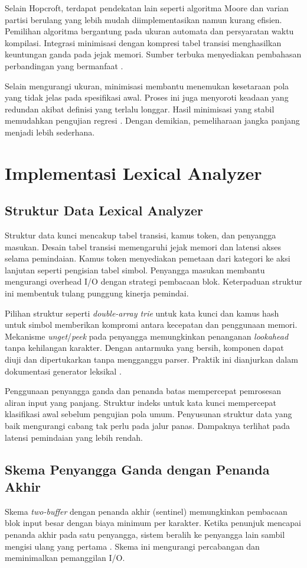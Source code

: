 \documentclass[../main.tex]{subfiles}
\begin{document}
Selain Hopcroft, terdapat pendekatan lain seperti algoritma Moore dan varian partisi berulang yang lebih mudah diimplementasikan namun kurang efisien. Pemilihan algoritma bergantung pada ukuran automata dan persyaratan waktu kompilasi. Integrasi minimisasi dengan kompresi tabel transisi menghasilkan keuntungan ganda pada jejak memori. Sumber terbuka menyediakan pembahasan perbandingan yang bermanfaat \citep{WikiDFAMin,Mogensen2010}.

Selain mengurangi ukuran, minimisasi membantu menemukan kesetaraan pola yang tidak jelas pada spesifikasi awal. Proses ini juga menyoroti keadaan yang redundan akibat definisi yang terlalu longgar. Hasil minimisasi yang stabil memudahkan pengujian regresi \citep{WikiDFAMin}. Dengan demikian, pemeliharaan jangka panjang menjadi lebih sederhana.

\section{Implementasi Lexical Analyzer}
\subsection{Struktur Data Lexical Analyzer}
Struktur data kunci mencakup tabel transisi, kamus token, dan penyangga masukan. Desain tabel transisi memengaruhi jejak memori dan latensi akses selama pemindaian. Kamus token menyediakan pemetaan dari kategori ke aksi lanjutan seperti pengisian tabel simbol. Penyangga masukan membantu mengurangi overhead I/O dengan strategi pembacaan blok. Keterpaduan struktur ini membentuk tulang punggung kinerja pemindai.

Pilihan struktur seperti \emph{double-array trie} untuk kata kunci dan kamus hash untuk simbol memberikan kompromi antara kecepatan dan penggunaan memori. Mekanisme \emph{unget}/\emph{peek} pada penyangga memungkinkan penanganan \emph{lookahead} tanpa kehilangan karakter. Dengan antarmuka yang bersih, komponen dapat diuji dan dipertukarkan tanpa mengganggu parser. Praktik ini dianjurkan dalam dokumentasi generator leksikal \citep{FlexManual}.

Penggunaan penyangga ganda dan penanda batas mempercepat pemrosesan aliran input yang panjang. Struktur indeks untuk kata kunci mempercepat klasifikasi awal sebelum pengujian pola umum. Penyusunan struktur data yang baik mengurangi cabang tak perlu pada jalur panas. Dampaknya terlihat pada latensi pemindaian yang lebih rendah.

\subsection{Skema Penyangga Ganda dengan Penanda Akhir}
Skema \emph{two-buffer} dengan penanda akhir (sentinel) memungkinkan pembacaan blok input besar dengan biaya minimum per karakter. Ketika penunjuk mencapai penanda akhir pada satu penyangga, sistem beralih ke penyangga lain sambil mengisi ulang yang pertama \citep{WikiLexicalAnalysis}. Skema ini mengurangi percabangan dan meminimalkan pemanggilan I/O.
\end{document}
